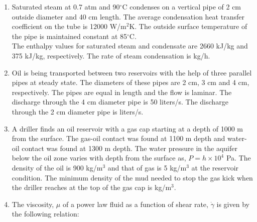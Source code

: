 \documentclass[journal,12pt,onecolumn]{IEEEtran}
\theoremstyle{remark}
\begin{document}
\begin{enumerate}
\hfill{}

\item Saturated steam at 0.7 atm and 90$^\circ$C condenses on a vertical pipe of 2 cm outside diameter and 40 cm length. The average condensation heat transfer coefficient on the tube is 12000 W/m$^2$K. The outside surface temperature of the pipe is maintained constant at 85$^\circ$C. \\ 
The enthalpy values for saturated steam and condensate are 2660 kJ/kg and 375 kJ/kg, respectively. The rate of steam condensation is \underline{\hspace{2cm}} kg/h.\\

\hfill{}

\item Oil is being transported between two reservoirs with the help of three parallel pipes at steady state. The diameters of these pipes are 2 cm, 3 cm and 4 cm, respectively. The pipes are equal in length and the flow is laminar. The discharge through the 4 cm diameter pipe is 50 liters/s. The discharge through the 2 cm diameter pipe is \underline{\hspace{2cm}} liters/s.  

\hfill{}

\pagebreak

\item A driller finds an oil reservoir with a gas cap starting at a depth of 1000 m from the surface. The gas-oil contact was found at 1100 m depth and water-oil contact was found at 1300 m depth. The water pressure in the aquifer below the oil zone varies with depth from the surface  as, $P = h \times 10^4$ Pa. The density of the oil is 900 kg/m$^3$ and that of gas is 5 kg/m$^3$ at the reservoir condition. The minimum density of the mud needed to stop the gas kick when the driller reaches at the top of the gas cap is \underline{\hspace{2cm}} kg/m$^3$.  

\hfill{}

\item The viscosity, $\mu$  of a power law fluid as a function of shear rate, $\dot{\gamma}$  is given by the following relation: 


\end{enumerate}
\end{document}
